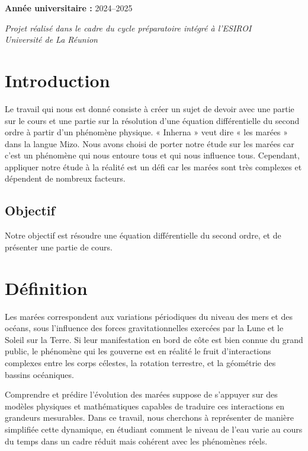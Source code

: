 \documentclass[a4paper,12pt,oneside]{article}
\begin{document}
\begin{titlepage}
\begin{flushleft}
        \textbf{Année universitaire :} 2024–2025\\[1cm]
    \end{flushleft}
    
    \vfill
    
    \begin{center}
        \textit{Projet réalisé dans le cadre du cycle préparatoire intégré à l'ESIROI}\\
        \textit{Université de La Réunion}
    \end{center}
    
    
\end{titlepage}

\section{Introduction}
Le travail qui nous est donné consiste à créer un sujet de devoir avec une partie sur le cours et une partie sur la résolution d'une équation différentielle du second ordre à partir d'un phénomène physique.
« Inherna » veut dire « les marées » dans la langue Mizo. Nous avons choisi de porter notre étude sur les marées car c'est un phénomène qui nous entoure tous et qui nous influence tous.
Cependant, appliquer notre étude à la réalité est un défi car les marées sont très complexes et dépendent de nombreux facteurs.

\subsection{Objectif}
Notre objectif est résoudre une équation différentielle du second ordre, et de présenter une partie de cours.

\section{Définition}
Les marées correspondent aux variations périodiques du niveau des mers et des océans, sous l'influence des forces gravitationnelles exercées par la Lune et le Soleil sur la Terre. Si leur manifestation en bord de côte est bien connue du grand public, le phénomène qui les gouverne est en réalité le fruit d'interactions complexes entre les corps célestes, la rotation terrestre, et la géométrie des bassins océaniques.

Comprendre et prédire l'évolution des marées suppose de s'appuyer sur des modèles physiques et mathématiques capables de traduire ces interactions en grandeurs mesurables. Dans ce travail, nous cherchons à représenter de manière simplifiée cette dynamique, en étudiant comment le niveau de l'eau varie au cours du temps dans un cadre réduit mais cohérent avec les phénomènes réels.
\end{document}
